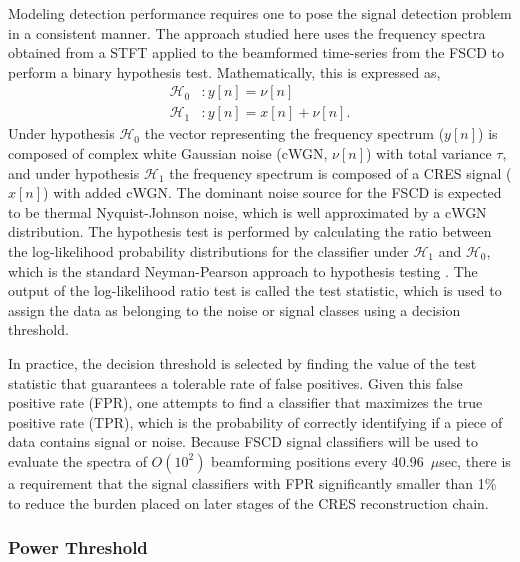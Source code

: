Modeling detection performance requires one to pose the signal detection problem in a consistent manner. The approach studied here uses the frequency spectra obtained from a STFT applied to the beamformed time-series from the FSCD to perform a binary hypothesis test. Mathematically, this is expressed as,
\begin{align}
    \mathcal{H}_0 & : y[n]=\nu[n]\\
    \mathcal{H}_1 & : y[n]=x[n]+\nu[n].
\end{align}
Under hypothesis $\mathcal{H}_0$ the vector representing the frequency spectrum ($y[n]$) is composed of complex white Gaussian noise (cWGN, $\nu[n]$) with total variance $\tau$, and under hypothesis $\mathcal{H}_1$ the frequency spectrum is composed of a CRES signal ($x[n]$) with added cWGN. The dominant noise source for the FSCD is expected to be thermal Nyquist-Johnson noise, which is well approximated by a cWGN distribution. The hypothesis test is performed by calculating the ratio between the log-likelihood probability distributions for the classifier under $\mathcal{H}_1$ and $\mathcal{H}_0$, which is the standard Neyman-Pearson approach to hypothesis testing \cite{detection_theory}. The output of the log-likelihood ratio test is called the test statistic, which is used to assign the data as belonging to the noise or signal classes using a decision threshold. 

In practice, the decision threshold is selected by finding the value of the test statistic that guarantees a tolerable rate of false positives. Given this false positive rate (FPR), one attempts to find a classifier that maximizes the true positive rate (TPR), which is the probability of correctly identifying if a piece of data contains signal or noise. Because FSCD signal classifiers will be used to evaluate the spectra of $O(10^2)$ beamforming positions every 40.96~$\mu$sec, there is a requirement that the signal classifiers with FPR significantly smaller than 1\% to reduce the burden placed on later stages of the CRES reconstruction chain.%

\subsubsection{Power Threshold}

